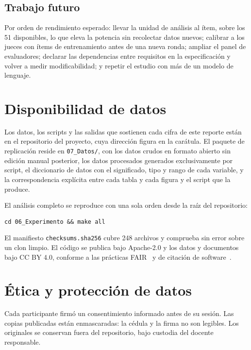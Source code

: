 \documentclass[11pt,a4paper]{article}
\begin{document}
\subsection{Trabajo futuro}

Por orden de rendimiento esperado: llevar la unidad de an\'alisis al \'item, sobre los 51
disponibles, lo que eleva la potencia sin recolectar datos nuevos; calibrar a los jueces
con \'items de entrenamiento antes de una nueva ronda; ampliar el panel de evaluadores;
declarar las dependencias entre requisitos en la especificaci\'on y volver a medir
modificabilidad; y repetir el estudio con m\'as de un modelo de lenguaje.

\section{Disponibilidad de datos}

Los datos, los scripts y las salidas que sostienen cada cifra de este reporte est\'an en
el repositorio del proyecto, cuya direcci\'on figura en la car\'atula. El paquete de
replicaci\'on reside en \texttt{07\_Datos/}, con los datos crudos en formato abierto sin
edici\'on manual posterior, los datos procesados generados exclusivamente por script, el
diccionario de datos con el significado, tipo y rango de cada variable, y la
correspondencia expl\'icita entre cada tabla y cada figura y el script que la produce.

El an\'alisis completo se reproduce con una sola orden desde la ra\'iz del repositorio:

\begin{verbatim}
cd 06_Experimento && make all
\end{verbatim}

El manifiesto \texttt{checksums.sha256} cubre 248 archivos y comprueba sin error sobre
un clon limpio. El c\'odigo se publica bajo Apache-2.0 y los datos y documentos bajo CC
BY 4.0, conforme a las pr\'acticas FAIR~\cite{wilkinson2016fair} y de citaci\'on de
software~\cite{smith2016software,druskat2021citation}.

\section{\'Etica y protecci\'on de datos}

Cada participante firm\'o un consentimiento informado antes de su sesi\'on. Las copias
publicadas est\'an enmascaradas: la c\'edula y la firma no son legibles. Los originales se
conservan fuera del repositorio, bajo custodia del docente responsable.
\end{document}
